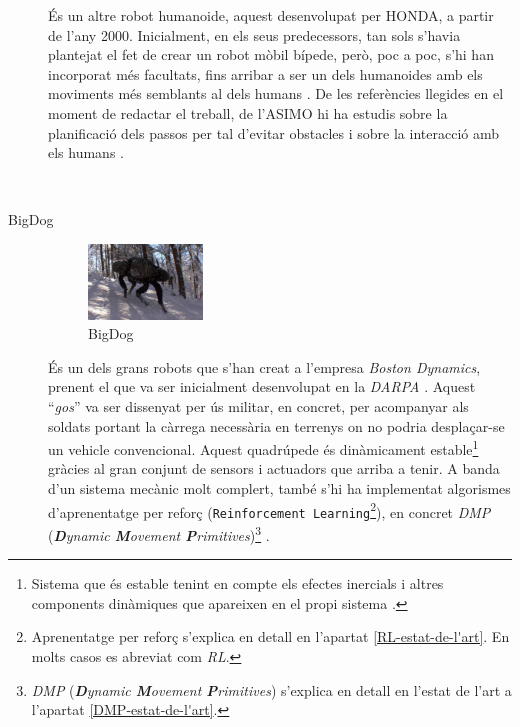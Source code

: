 \documentclass[12pt,a4paper,final,twoside]{article}
\begin{document}
\begin{description}
\begin{minipage}[t]{0.94\linewidth}
És un altre robot humanoide, aquest desenvolupat per HONDA, a partir de l'any 2000. Inicialment, en els seus predecessors, tan sols s'havia plantejat el fet de crear un robot mòbil bípede, però, poc a poc, s'hi han incorporat més facultats, fins arribar a ser un dels humanoides amb els moviments més semblants al dels humans \cite{ASIMO_History}. De les referències llegides en el moment de redactar el treball, de l'ASIMO hi ha estudis sobre la planificació dels passos per tal d'evitar obstacles \cite{Chestnutt2005} i sobre la interacció amb els humans \cite{Mutlu2006}.
\end{minipage}\\


\item[BigDog]
\begin{minipage}[t]{0.94\linewidth}
	\begin{figure}
	    \centering
		\includegraphics[width=0.30\textwidth]{Imatges/BigDog}
                \caption{BigDog \cite{Raibert2008}}
	\end{figure}
És un dels grans robots que s'han creat a l'empresa \textit{Boston Dynamics}, prenent el que va ser inicialment desenvolupat en la \textit{DARPA} \cite{Raibert2008}. Aquest ``\textit{gos}'' va ser dissenyat per ús militar, en concret, per acompanyar als soldats portant la càrrega necessària en terrenys on no podria desplaçar-se un vehicle convencional. Aquest quadrúpede és dinàmicament estable\footnote{Sistema que és estable tenint en compte els efectes inercials i altres components dinàmiques que apareixen en el propi sistema \cite{Purushotham2009}.} gràcies al gran conjunt de sensors i actuadors que arriba a tenir. A banda d'un sistema mecànic molt complert, també s'hi ha implementat algorismes d'aprenentatge per reforç (\texttt{Reinforcement Learning}\footnote{Aprenentatge per reforç s'explica en detall en l'apartat \ref{RL-estat-de-l'art}. En molts casos es abreviat com \textit{RL}.}), en concret \textit{DMP} (\textit{\textbf{D}ynamic \textbf{M}ovement \textbf{P}rimitives})\footnote{\textit{DMP} (\textit{\textbf{D}ynamic \textbf{M}ovement \textbf{P}rimitives}) s'explica en detall en l'estat de l'art a l'apartat \ref{DMP-estat-de-l'art}. } \cite{Raibert2008}.
\end{minipage}


\end{description}
\end{document}
